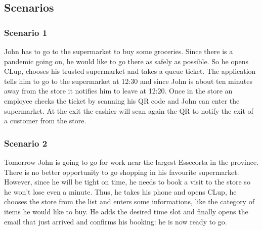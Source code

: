 \begin{description}


        \item {}




        \item {}



    \end{description}

	\clearpage
    \subsection{Scenarios}
		\subsubsection{Scenario 1}
		John has to go to the supermarket to buy some groceries. Since there is a pandemic going on, he would like to go there as safely as possible.\newline
		So he opens CLup, chooses his trusted supermarket and takes a queue ticket. The application tells him to go to the supermarket at 12:30 and since John is about ten minutes away from the store it notifies him to leave at 12:20. Once in the store an employee checks the ticket by scanning his QR code and John can enter the supermarket.
		At the exit the cashier will scan again the QR to notify the exit of a customer from the store.
		\subsubsection{Scenario 2}
		Tomorrow John is going to go for work near the largest Essecorta in the province. There is no better opportunity to go shopping in his favourite supermarket.\newline
		However, since he will be tight on time, he needs to book a visit to the store so he won't lose even a minute. Thus, he takes his phone and opens CLup, he chooses the store from the list and enters some informations, like the category of items he would like to buy. He adds the desired time slot and finally opens the email that just arrived and confirms his booking: he is now ready to go.
